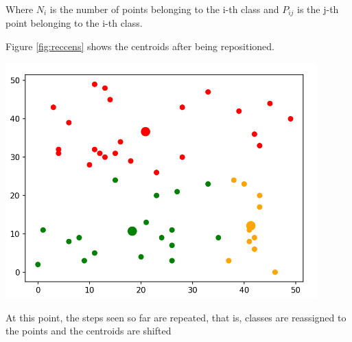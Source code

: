 \documentclass{report}
\begin{document}
\begin{minipage}[b]{0.48\textwidth}
  Where $N_i$ is the number of points belonging to the i-th class and $P_{ij}$ is the j-th point belonging to the i-th class. 

  Figure \ref{fig:reccens} shows the centroids after being repositioned. 
  
  \begin{center}    
      \includegraphics[width = 0.9\textwidth]{imgs/reccens.png}
      \label{fig:reccens}
  \end{center}

  At this point, the steps seen so far are repeated, that is, classes are reassigned to the points and the centroids are shifted 
\end{minipage}

\newpage
\end{document}
